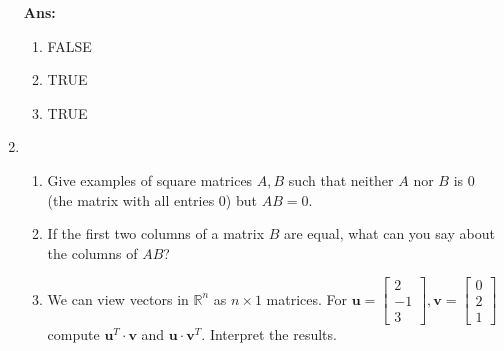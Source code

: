 \documentclass[12pt,a4paper]{amsart}
\newcommand{\bu}{\mathbf u}
\newcommand{\bv}{\mathbf v}
\newcommand{\R}{\mathbb{R}}
\newcommand\sol[1]{
\medskip
\begin{mdframed}
\textbf{Ans:\\} #1
\end{mdframed}
\medskip
}
\begin{document}
\begin{enumerate}
\sol{
  \begin{enumerate}
    \item FALSE\\
    \item TRUE\\
    \item TRUE\\
  \end{enumerate}
}
  
\item  
\begin{enumerate}
\item
 Give examples of square matrices $A, B$ such that neither $A$ nor $B$ is $0$ (the matrix with all entries $0$) but
 $AB = 0$. 
\item
 If the first two columns of a matrix $B$ are equal, what can you say about the columns of $AB$?
\item
 We can view vectors in $\R^n$ as $n\times 1$ matrices. For
 $\bu = \left[\begin{matrix} 2  \\ -1  \\ 3 \end{matrix}\right], \bv = \left[\begin{matrix} 0  \\ 2 \\ 1 \end{matrix}\right]$
 compute $\bu^T\cdot \bv$ and $\bu\cdot \bv^T$. Interpret the results.  
\end{enumerate}


\end{enumerate}
\end{document}
